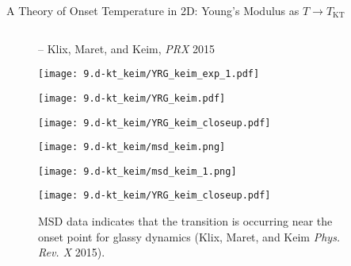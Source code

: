 \begin{frame}{A Theory of Onset Temperature in 2D: Young's Modulus as $T \to T_\mathrm{KT}$}
\begin{columns}
\begin{column}[T]{0.425\textwidth}
\begin{figure}
\begin{overprint}
{    -- Klix, Maret, and Keim, \textit{PRX} 2015}
    

    \centering\texttt{[image: 9.d-kt\_keim/YRG\_keim\_exp\_1.pdf]}\caption{Young's modulus data, (re)computed from the bulk/shear moduli data.}
    
    \centering\texttt{[image: 9.d-kt\_keim/YRG\_keim.pdf]}\caption{Prediction agrees with experiments. Input: RDF and Young's modulus at high-$\Gamma$\vspace{-10pt}\footnote{ F. Ebert, Ph.D. Dissertation, 2008; C. Klix, Ph.D. Dissertation, 2014}.}
    
    \centering\texttt{[image: 9.d-kt\_keim/YRG\_keim\_closeup.pdf]}\caption{A closeup of RG prediction with exp. data}
    
    \vspace{20pt}\centering\texttt{[image: 9.d-kt\_keim/msd\_keim.png]}\caption{MSD data around the transition  (Klix, Maret, and Keim \textit{Phys. Rev. X} 2015).}
    
    \vspace{20pt}\centering\texttt{[image: 9.d-kt\_keim/msd\_keim\_1.png]}\caption{MSD data indicates that the transition is occurring near the onset point for glassy dynamics  (Klix, Maret, and Keim \textit{Phys. Rev. X} 2015).}
    
    
    \centering\texttt{[image: 9.d-kt\_keim/YRG\_keim\_closeup.pdf]}%
    
    
    \end{overprint}
    \end{figure}
    

\end{column}

\begin{column}[T]{0.575\textwidth}



\end{column}
\end{columns}
\end{frame}
